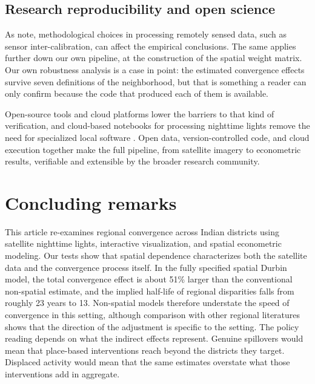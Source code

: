 \documentclass[
  a4paper, 
  twoside,
  final
]{article}
\newcounter{code}
\begin{document}
\subsection{Research reproducibility and open
science}\label{research-reproducibility-and-open-science}

As \citet{donaldson_storeygard_remotesensing} note, methodological
choices in processing remotely sensed data, such as sensor
inter-calibration, can affect the empirical conclusions. The same
applies further down our own pipeline, at the construction of the
spatial weight matrix. Our own robustness analysis is a case in point:
the estimated convergence effects survive seven definitions of the
neighborhood, but that is something a reader can only confirm because
the code that produced each of them is available.

Open-source tools and cloud platforms lower the barriers to that kind of
verification, and cloud-based notebooks for processing nighttime lights
remove the need for specialized local software
\citep{mendez_patnaik_notebook}. Open data, version-controlled code, and
cloud execution together make the full pipeline, from satellite imagery
to econometric results, verifiable and extensible by the broader
research community.

\section{Concluding remarks}\label{concluding-remarks}

This article re-examines regional convergence across Indian districts
using satellite nighttime lights, interactive visualization, and spatial
econometric modeling. Our tests show that spatial dependence
characterizes both the satellite data and the convergence process
itself. In the fully specified spatial Durbin model, the total
convergence effect is about 51\% larger than the conventional
non-spatial estimate, and the implied half-life of regional disparities
falls from roughly 23 years to 13. Non-spatial models therefore
understate the speed of convergence in this setting, although comparison
with other regional literatures shows that the direction of the
adjustment is specific to the setting. The policy reading depends on
what the indirect effects represent. Genuine spillovers would mean that
place-based interventions reach beyond the districts they target.
Displaced activity would mean that the same estimates overstate what
those interventions add in aggregate.
\end{document}
